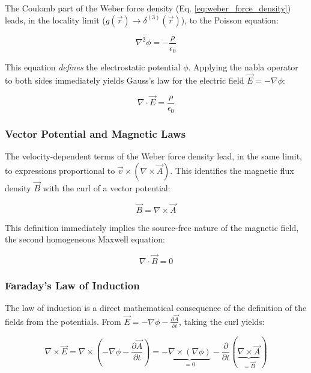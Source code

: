 The Coulomb part of the Weber force density (Eq. \ref{eq:weber_force_density}) leads, in the locality limit ($g(\vec{r}) \rightarrow \delta^{(3)}(\vec{r})$), to the Poisson equation:

\begin{equation}
    \nabla^2 \phi = -\frac{\rho}{\epsilon_0}
\end{equation}

This equation \textit{defines} the electrostatic potential $\phi$. Applying the nabla operator to both sides immediately yields Gauss's law for the electric field $\vec{E} = -\nabla \phi$:

\begin{equation}
    \nabla \cdot \vec{E} = \frac{\rho}{\epsilon_0}
\end{equation}

\subsubsection{Vector Potential and Magnetic Laws}

The velocity-dependent terms of the Weber force density lead, in the same limit, to expressions proportional to $\vec{v} \times (\nabla \times \vec{A})$. This identifies the magnetic flux density $\vec{B}$ with the curl of a vector potential:

\begin{equation}
    \vec{B} = \nabla \times \vec{A}
\end{equation}

This definition immediately implies the source-free nature of the magnetic field, the second homogeneous Maxwell equation:

\begin{equation}
    \nabla \cdot \vec{B} = 0
\end{equation}

\subsubsection{Faraday's Law of Induction}

The law of induction is a direct mathematical consequence of the definition of the fields from the potentials. From $\vec{E} = -\nabla \phi - \frac{\partial \vec{A}}{\partial t}$, taking the curl yields:

\begin{equation}
    \nabla \times \vec{E} = \nabla \times (-\nabla \phi - \frac{\partial \vec{A}}{\partial t}) = - \underbrace{\nabla \times (\nabla \phi)}_{=0} - \frac{\partial}{\partial t} (\underbrace{\nabla \times \vec{A}}_{=\vec{B}})
\end{equation}

